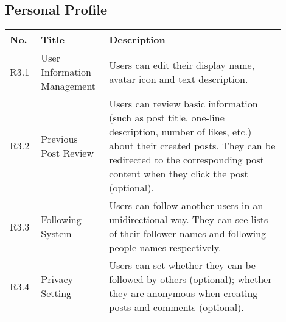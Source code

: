 \documentclass[a4paper,11pt]{scrreprt}
\begin{document}
\smallskip

\subsection{Personal Profile}
\begin{tabular}{|>{\centering\arraybackslash}m{0.1\linewidth}|>{\centering\arraybackslash}m{0.2\linewidth}|m{0.6\linewidth}|} \hline
     No.&  Title&Description\\ \hline 
     R3.1&   User Information Management&Users can edit their display name, avatar icon and text description.\\ \hline 
     R3.2&   Previous Post Review&Users can review basic information (such as post title, one-line description, number of likes, etc.) about their created posts. They can be redirected to the corresponding post content when they click the post (optional).\\ \hline 
     R3.3&   Following System&Users can follow another users in an unidirectional way. They can see lists of their follower names and following people names respectively.\\ \hline
     R3.4& Privacy Setting&Users can set whether they can be followed by others (optional); whether they are anonymous when creating posts and comments (optional).\\\hline
\end{tabular}

\pagebreak
\end{document}
